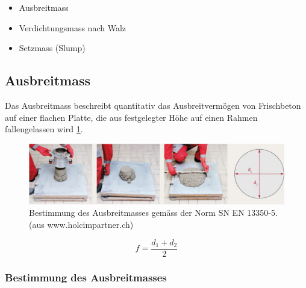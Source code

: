 \begin{itemize}
	\item Ausbreitmass
	\item  Verdichtungsmass nach Walz 
	\item Setzmass (Slump)
\end{itemize}


\subsection*{Ausbreitmass}
Das Ausbreitmass beschreibt quantitativ das Ausbreitvermögen von Frischbeton auf einer flachen Platte, die aus festgelegter Höhe auf einen Rahmen fallengelassen wird \cref{fig:BestimmungAusbreitmass}. 


\begin{figure}[h!bt]
	\centering
	\includegraphics[width=1.0\linewidth]{Bilder/Ausbreitmass.png}
	\caption{Bestimmung des Ausbreitmasses gemäss der Norm SN EN 13350-5. (aus www.holcimpartner.ch)}
	\label{fig:BestimmungAusbreitmass}
\end{figure}

\begin{equation}
	f = \dfrac{d_1+d_2}{2}
	\label{eq:Ausbreitmass}
\end{equation}


\subsubsection*{Bestimmung des Ausbreitmasses}

